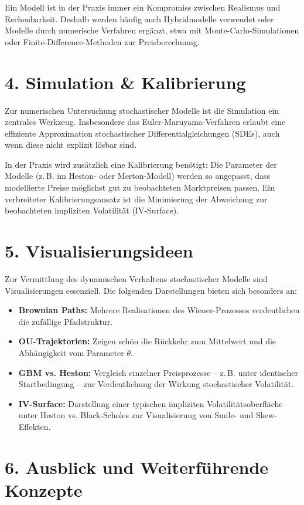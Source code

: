 \documentclass[a4paper,12pt]{article}
\begin{document}
Ein Modell ist in der Praxis immer ein Kompromiss zwischen Realismus und Rechenbarkeit. Deshalb werden häufig auch Hybridmodelle verwendet oder Modelle durch numerische Verfahren ergänzt, etwa mit Monte-Carlo-Simulationen oder Finite-Difference-Methoden zur Preisberechnung.

\section*{4. Simulation \& Kalibrierung}

Zur numerischen Untersuchung stochastischer Modelle ist die Simulation ein zentrales Werkzeug. Insbesondere das Euler-Maruyama-Verfahren erlaubt eine effiziente Approximation stochastischer Differentialgleichungen (SDEs), auch wenn diese nicht explizit lösbar sind.

In der Praxis wird zusätzlich eine Kalibrierung benötigt: Die Parameter der Modelle (z.\,B. im Heston- oder Merton-Modell) werden so angepasst, dass modellierte Preise möglichst gut zu beobachteten Marktpreisen passen. Ein verbreiteter Kalibrierungsansatz ist die Minimierung der Abweichung zur beobachteten impliziten Volatilität (IV-Surface).

\clearpage
\section*{5. Visualisierungsideen}

Zur Vermittlung des dynamischen Verhaltens stochastischer Modelle sind Visualisierungen essenziell. Die folgenden Darstellungen bieten sich besonders an:

\begin{itemize}
  \item \textbf{Brownian Paths:} Mehrere Realisationen des Wiener-Prozesses verdeutlichen die zufällige Pfadstruktur.
  \item \textbf{OU-Trajektorien:} Zeigen schön die Rückkehr zum Mittelwert und die Abhängigkeit vom Parameter \(\theta\).
  \item \textbf{GBM vs. Heston:} Vergleich einzelner Preisprozesse – z.\,B. unter identischer Startbedingung – zur Verdeutlichung der Wirkung stochastischer Volatilität.
  \item \textbf{IV-Surface:} Darstellung einer typischen impliziten Volatilitätsoberfläche unter Heston vs. Black-Scholes zur Visualisierung von Smile- und Skew-Effekten.
\end{itemize}

\section*{6. Ausblick und Weiterführende Konzepte}
\end{document}
